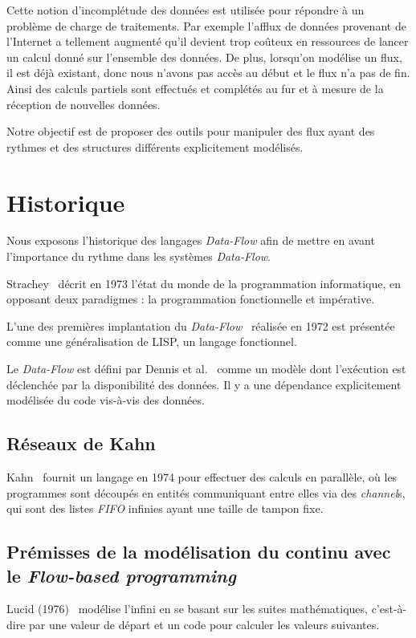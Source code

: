 \documentclass{llncs}
\newcommand{\DF}{\emph{Data-Flow} }
\newcommand{\DFc}{\emph{Data-Flow}}
\newcommand{\DFp}{\emph{Data-Flow}. }
\newcommand{\FB}{\emph{Flow-based programming} }
\begin{document}
Cette notion d'incomplétude des données est utilisée pour répondre à un problème
de charge de traitements.
Par exemple l'afflux de données provenant de l'Internet a tellement augmenté qu'il
devient trop coûteux en ressources de lancer un calcul donné sur l'ensemble des
données.
De plus, lorsqu'on modélise un flux, il est déjà existant, donc nous n'avons pas
accès au début et le flux n'a pas de fin.
Ainsi des calculs partiels sont effectués et complétés au fur et à mesure de la
réception de nouvelles données.

Notre objectif est de proposer des outils pour manipuler des flux ayant des
rythmes et des structures différents explicitement modélisés.

\section{Historique}
Nous exposons l'historique des langages \DF afin
de mettre en avant l'importance du rythme dans les systèmes \DFp

Strachey~\cite{Strachey73} décrit en 1973 l'état du monde de la programmation
informatique, en opposant deux paradigmes : la programmation fonctionnelle et impérative.

L'une des premières implantation du \DFc~\cite{Dennis72} réalisée
en 1972 est présentée comme une généralisation de LISP, un langage fonctionnel.

Le \DF est défini par Dennis et al.~\cite{Dennis72} comme un modèle dont l'exécution
est déclenchée par la disponibilité des données.
Il y a une dépendance explicitement modélisée du code vis-à-vis des données.

\subsection{Réseaux de Kahn}
Kahn~\cite{Kahn74} fournit un langage en 1974 pour effectuer des calculs en parallèle,
où les programmes sont découpés en entités communiquant entre elles via des
\emph{channel}s, qui sont des listes \emph{FIFO} infinies ayant une taille de
tampon fixe.

\subsection{Prémisses de la modélisation du continu avec le \FB}
Lucid (1976)~\cite{AshcroftW76} modélise l'infini en se basant sur les suites mathématiques,
c'est-à-dire par une valeur de départ et un code pour calculer les valeurs suivantes.
\end{document}
